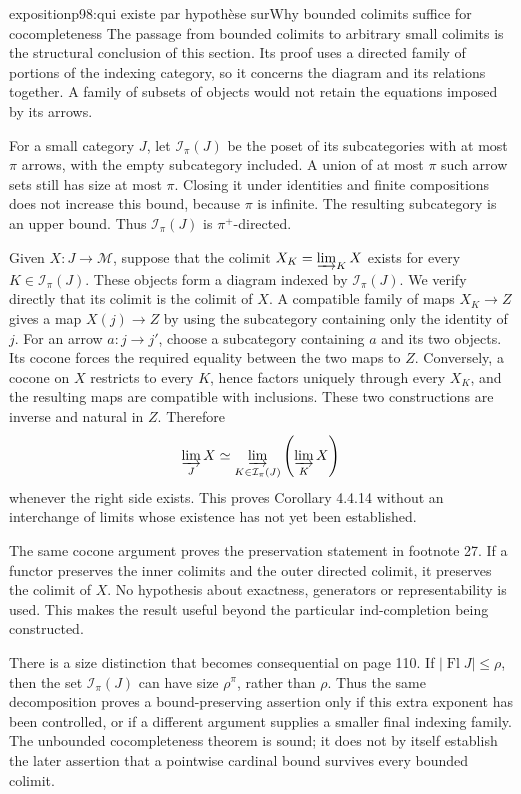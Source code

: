 \begin{dcomment}{exposition}{p98:qui existe par hypothèse sur}{Why bounded colimits suffice for cocompleteness}
The passage from bounded colimits to arbitrary small colimits is the structural conclusion of this section. Its proof uses a directed family of portions of the indexing category, so it concerns the diagram and its relations together. A family of subsets of objects would not retain the equations imposed by its arrows.

For a small category $J$, let $\mathcal I_\pi(J)$ be the poset of its subcategories with at most $\pi$ arrows, with the empty subcategory included. A union of at most $\pi$ such arrow sets still has size at most $\pi$. Closing it under identities and finite compositions does not increase this bound, because $\pi$ is infinite. The resulting subcategory is an upper bound. Thus $\mathcal I_\pi(J)$ is $\pi^+$-directed.

Given $X:J\to\mathcal M$, suppose that the colimit $X_K=\varinjlim_K X$ exists for every $K\in\mathcal I_\pi(J)$. These objects form a diagram indexed by $\mathcal I_\pi(J)$. We verify directly that its colimit is the colimit of $X$. A compatible family of maps $X_K\to Z$ gives a map $X(j)\to Z$ by using the subcategory containing only the identity of $j$. For an arrow $a:j\to j'$, choose a subcategory containing $a$ and its two objects. Its cocone forces the required equality between the two maps to $Z$. Conversely, a cocone on $X$ restricts to every $K$, hence factors uniquely through every $X_K$, and the resulting maps are compatible with inclusions. These two constructions are inverse and natural in $Z$. Therefore
\[
\varinjlim_J X\simeq
\varinjlim_{K\in\mathcal I_\pi(J)}\left(\varinjlim_KX\right)
\]
whenever the right side exists. This proves Corollary 4.4.14 without an interchange of limits whose existence has not yet been established.

The same cocone argument proves the preservation statement in footnote 27. If a functor preserves the inner colimits and the outer directed colimit, it preserves the colimit of $X$. No hypothesis about exactness, generators or representability is used. This makes the result useful beyond the particular ind-completion being constructed.

There is a size distinction that becomes consequential on page 110. If $|\operatorname{Fl}J|\leq\rho$, then the set $\mathcal I_\pi(J)$ can have size $\rho^\pi$, rather than $\rho$. Thus the same decomposition proves a bound-preserving assertion only if this extra exponent has been controlled, or if a different argument supplies a smaller final indexing family. The unbounded cocompleteness theorem is sound; it does not by itself establish the later assertion that a pointwise cardinal bound survives every bounded colimit.
\end{dcomment}

